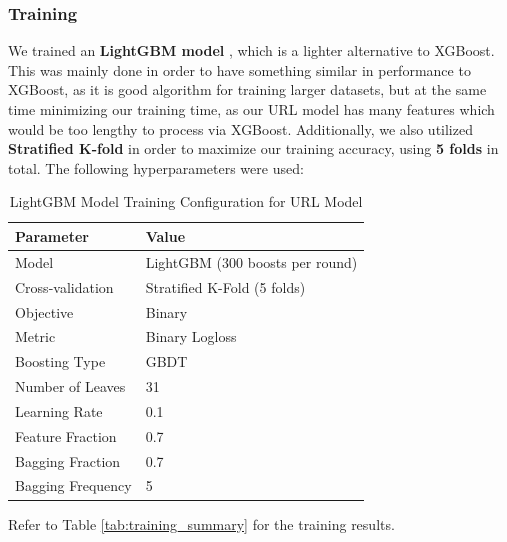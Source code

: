 \documentclass{article}
\begin{document}
\subsubsection*{Training}

\noindent
We trained an \textbf{LightGBM model} , which is a lighter alternative to XGBoost. This was mainly done in order to have something similar in performance to XGBoost, as it is good algorithm for training larger datasets, but at the same time minimizing our training time, as our URL model has many features which would be too lengthy to process via XGBoost. Additionally, we also utilized \textbf{Stratified K-fold} in order to maximize our training accuracy, using \textbf{5 folds} in total. The following hyperparameters were used: 

\begin{table}[h!]
    \centering
    \renewcommand{\arraystretch}{1.2}
    \setlength{\tabcolsep}{11pt}
    \begin{tabular}{|l|l|}
        \hline
        \textbf{Parameter} & \textbf{Value} \\
        \hline
        Model & LightGBM (300 boosts per round) \\
        \hline
        Cross-validation & Stratified K-Fold (5 folds) \\
        \hline
        Objective & Binary \\
        \hline
        Metric & Binary Logloss \\
        \hline
        Boosting Type & GBDT \\
        \hline
        Number of Leaves & 31 \\
        \hline
        Learning Rate & 0.1 \\
        \hline
        Feature Fraction & 0.7 \\
        \hline
        Bagging Fraction & 0.7 \\
        \hline
        Bagging Frequency & 5 \\
        \hline
    \end{tabular}
    \caption{LightGBM Model Training Configuration for URL Model}
\end{table}

\noindent
Refer to Table \ref{tab:training_summary} for the training results.
\newline
\end{document}
